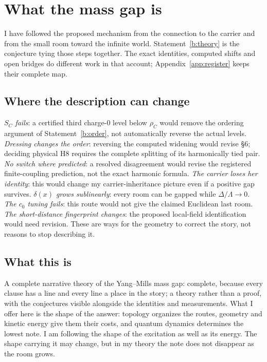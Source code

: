 \section{What the mass gap is}

I have followed the proposed mechanism from the connection to the carrier and from the small room toward the
infinite world. Statement~\ref{b:theory} is the conjecture tying those steps together.
The exact identities, computed shifts and open bridges do different work in that account; Appendix~\ref{app:register}
keeps their complete map.

\subsection*{Where the description can change}

\emph{$S_C$ fails}: a certified third charge-0 level below $\rho_C$
would remove the ordering argument of Statement~\ref{b:order}, not automatically reverse the actual levels.
\emph{Dressing changes the order}: reversing the computed widening would revise \S6; deciding physical H8 requires
the complete splitting of its harmonically tied pair. \emph{No switch where predicted}: a resolved disagreement
would revise the registered finite-coupling prediction, not the exact harmonic formula.
\emph{The carrier loses her identity}: this would change my carrier-inheritance picture even if a positive gap survives.
\emph{$\delta(x)$ grows sublinearly}: every room can be gapped while $\Delta/\Lambda\to0$.
\emph{The $c_0$ tuning fails}: this route would not give the claimed Euclidean last room.
\emph{The short-distance fingerprint changes}: the proposed local-field identification would need revision.
These are ways for the geometry to correct the story, not reasons to stop describing it.

\subsection*{What this is}

A complete narrative theory of the Yang--Mills mass gap: complete, because every clause has a
line and every line a place in the story; a theory rather than a proof, with the conjectures visible alongside the
identities and measurements. What I offer here is the shape of the answer: topology organizes the routes, geometry
and kinetic energy give them their costs, and quantum dynamics determines the lowest note. I am following the shape
of the excitation as well as its energy. The shape carrying it may change, but in my theory the note does not
disappear as the room grows.
